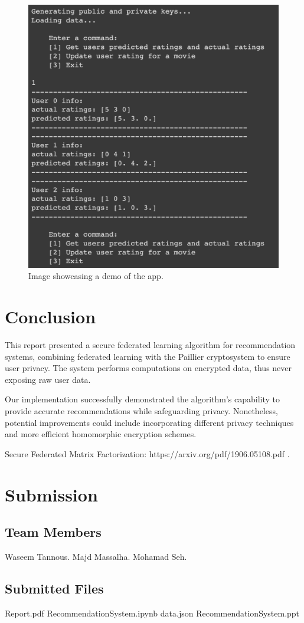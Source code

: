 \documentclass{article}
\begin{document}
\begin{figure}[h]
  \centering
  \includegraphics[width=\textwidth]{demo2.png}
  \caption{Image showcasing a demo of the app.}
  \label{fig:image}
\end{figure}


\section{Conclusion}
This report presented a secure federated learning algorithm for recommendation systems, combining federated learning with the Paillier cryptosystem to ensure user privacy. The system performs computations on encrypted data, thus never exposing raw user data.

Our implementation successfully demonstrated the algorithm's capability to provide accurate recommendations while safeguarding privacy. Nonetheless, potential improvements could include incorporating different privacy techniques and more efficient homomorphic encryption schemes.



Secure Federated Matrix Factorization: https://arxiv.org/pdf/1906.05108.pdf .
\newline

\section{Submission}
\subsection{Team Members}
Waseem Tannous.
\newline
Majd Massalha.
\newline
Mohamad Seh.

\subsection{Submitted Files}
Report.pdf
\newline
RecommendationSystem.ipynb
\newline
data.json
\newline
RecommendationSystem.ppt
\end{document}
